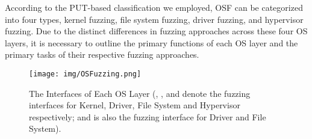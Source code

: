 
According to the PUT-based classification we employed, OSF can be categorized into four types, \ie kernel fuzzing, file system fuzzing, driver fuzzing, and hypervisor fuzzing. Due to the distinct differences in fuzzing approaches across these four OS layers, it is necessary to outline the primary functions of each OS layer and the primary tasks of their respective fuzzing approaches.


\begin{figure}[!t]
  \centering
  \texttt{[image: img/OSFuzzing.png]}
  \caption{The Interfaces of Each OS Layer (\protect{}, \protect{}, \protect{} and \protect{} denote the fuzzing interfaces for Kernel, Driver, File System and Hypervisor respectively; and \protect{} is also the fuzzing interface for Driver and File System).}
  \label{OSFuzzing}
\end{figure}



